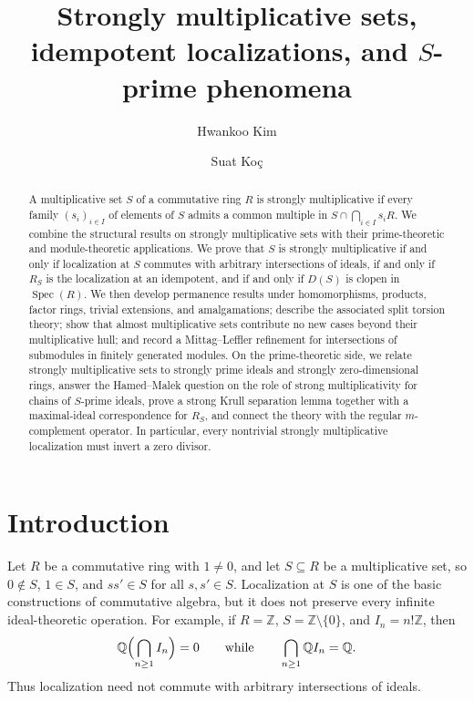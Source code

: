 \documentclass[11pt]{amsart}
\title[Strongly multiplicative sets]{Strongly multiplicative sets, idempotent localizations, and $S$-prime phenomena}
\author{Hwankoo Kim}
\author{Suat Ko\c{c}}
\theoremstyle{definition}
\theoremstyle{remark}
\newcommand{\Spec}{\operatorname{Spec}}
\begin{document}
\begin{abstract}
A multiplicative set $S$ of a commutative ring $R$ is strongly multiplicative if every family $(s_i)_{i \in I}$ of elements of $S$ admits a common multiple in $S \cap \bigcap_{i \in I} s_iR$.
We combine the structural results on strongly multiplicative sets with their prime-theoretic and module-theoretic applications.
We prove that $S$ is strongly multiplicative if and only if localization at $S$ commutes with arbitrary intersections of ideals, if and only if $R_S$ is the localization at an idempotent, and if and only if $D(S)$ is clopen in $\Spec(R)$.
We then develop permanence results under homomorphisms, products, factor rings, trivial extensions, and amalgamations; describe the associated split torsion theory; show that almost multiplicative sets contribute no new cases beyond their multiplicative hull; and record a Mittag--Leffler refinement for intersections of submodules in finitely generated modules.
On the prime-theoretic side, we relate strongly multiplicative sets to strongly prime ideals and strongly zero-dimensional rings, answer the Hamed--Malek question on the role of strong multiplicativity for chains of $S$-prime ideals, prove a strong Krull separation lemma together with a maximal-ideal correspondence for $R_S$, and connect the theory with the regular $m$-complement operator.
In particular, every nontrivial strongly multiplicative localization must invert a zero divisor.
\end{abstract}

\maketitle

\section{Introduction}

Let $R$ be a commutative ring with $1 \neq 0$, and let $S \subseteq R$ be a multiplicative set, so $0 \notin S$, $1 \in S$, and $ss' \in S$ for all $s,s' \in S$.
Localization at $S$ is one of the basic constructions of commutative algebra, but it does not preserve every infinite ideal-theoretic operation.
For example, if $R=\mathbb{Z}$, $S=\mathbb{Z}\setminus\{0\}$, and $I_n=n!\mathbb{Z}$, then
\[
\mathbb{Q}\Bigl(\bigcap_{n \geq 1} I_n\Bigr)=0
\qquad\text{while}\qquad
\bigcap_{n \geq 1}\mathbb{Q}I_n=\mathbb{Q}.
\]
Thus localization need not commute with arbitrary intersections of ideals.
\end{document}
